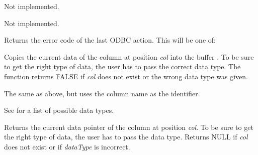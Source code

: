 
Not implemented.



Not implemented.



Returns the error code of the last ODBC action. This will be one of:

\begin{twocollist}\itemsep=0pt
\end{twocollist}

\label{wxrecordsetgetfielddata}


Copies the current data of the column at position {\it col} into the buffer
. To be sure to get the right type of data, the user has to pass the
correct data type. The function returns FALSE if {\it col} does not
exist or the wrong data type was given.


The same as above, but uses the column name as the identifier.

See  for a list
of possible data types.

\label{wxrecordsetgetfielddataptr}


Returns the current data pointer of the column at position {\it col}.
To be sure to get the right type of data, the user has to pass the
data type. Returns NULL if {\it col} does not exist or if {\it dataType} is
incorrect.

